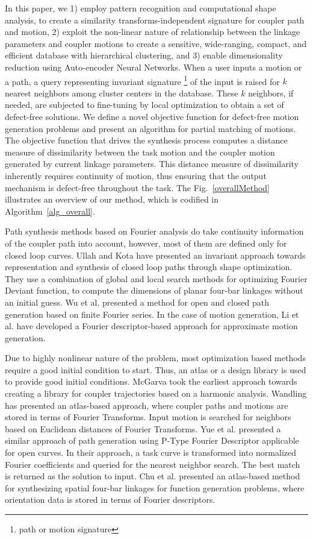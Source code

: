 \documentclass[twocolumn,10pt]{asme2e}
\begin{document}
In this paper, we 1) employ pattern recognition and computational shape analysis, to create a similarity transforms-independent signature for coupler path and motion, 2) exploit the non-linear nature of relationship between the linkage parameters and coupler motions to create a sensitive, wide-ranging, compact, and efficient database with hierarchical clustering, and 3) enable dimensionality reduction using Auto-encoder Neural Networks.
When a user inputs a motion or a path, a query representing invariant signature \footnote{path or motion signature} of the input is raised for $k$ nearest neighbors among cluster centers in the database.
These $k$ neighbors, if needed, are subjected to fine-tuning by local optimization to obtain a set of defect-free solutions.
We define a novel objective function for defect-free motion generation problems and present an algorithm for partial matching of motions.
The objective function that drives the synthesis process computes a distance measure of dissimilarity between the task motion and the coupler motion generated by current linkage parameters.
This distance measure of dissimilarity inherently requires continuity of motion, thus ensuring that the output mechanism is defect-free throughout the task.
The Fig.~\ref{overallMethod} illustrates an overview of our method, which is codified in Algorithm~\ref{alg_overall}.

Path synthesis methods based on Fourier analysis do take continuity information of the coupler path into account, however, most of them are defined only for closed loop curves.
Ullah and Kota\cite{ullah1997} have presented an invariant approach towards representation and synthesis of closed loop paths through shape optimization.
They use a combination of global and local search methods for optimizing Fourier Deviant function, to compute the dimensions of planar four-bar linkages without an initial guess.
Wu et al.\cite{wu2011} presented a method for open and closed path generation based on finite Fourier series.
In the case of motion generation, Li et al.\cite{li2016} have developed a Fourier descriptor-based approach for approximate motion generation.

Due to highly nonlinear nature of the problem, most optimization based methods require a good initial condition to start.
Thus, an atlas or a design library is used to provide good initial conditions.
McGarva\cite{mcgarva1994} took the earliest approach towards creating a library for coupler trajectories based on a harmonic analysis.
Wandling\cite{wandling2000} has presented an atlas-based approach, where coupler paths and motions are stored in terms of Fourier Transforms.
Input motion is searched for neighbors based on Euclidean distances of Fourier Transforms.
Yue et al.\cite{yue-pathgen2011} presented a similar approach of path generation using P-Type Fourier Descriptor applicable for open curves.
In their approach, a task curve is transformed into normalized Fourier coefficients and queried for the nearest neighbor search.
The best match is returned as the solution to input.
Chu et al.\cite{chu2010} presented an atlas-based method for synthesizing spatial four-bar linkages for function generation problems, where orientation data is stored in terms of Fourier descriptors.
\end{document}
